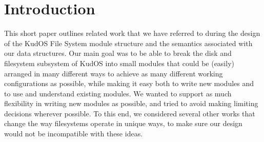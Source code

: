 \section{Introduction}
\label{sec:intro}

This short paper outlines related work that we have referred to during
the design of the KudOS File System module structure and the semantics
associated with our data structures. Our main goal was to be able to
break the disk and filesystem subsystem of KudOS into small modules
that could be (easily) arranged in many different ways to achieve as
many different working configurations as possible, while making it
easy both to write new modules and to use and understand existing
modules. We wanted to support as much flexibility in writing new
modules as possible, and tried to avoid making limiting decisions
wherever possible. To this end, we considered several other works that
change the way filesystems operate in unique ways, to make sure our
design would not be incompatible with these ideas.
